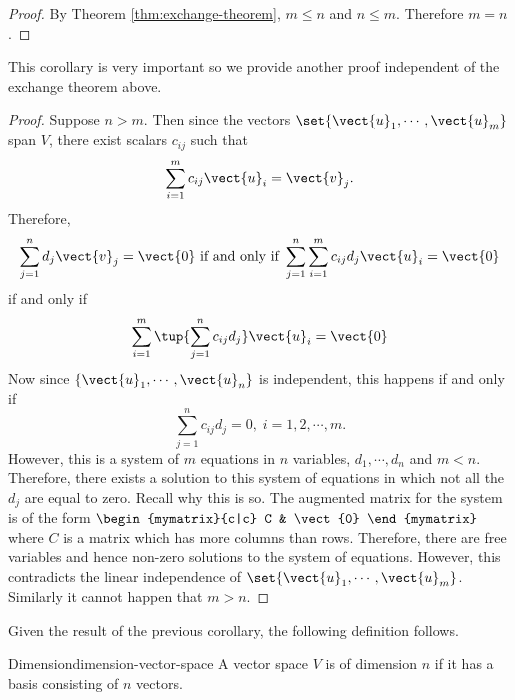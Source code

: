 \begin{proof} By Theorem \ref{thm:exchange-theorem}, $m\leq n$ and $n\leq m$. Therefore $m=n$. 
\end{proof}

This corollary is very important so we provide another proof independent of the exchange theorem above.

\begin{proof}Suppose $n > m$. Then since the vectors $\set{\vect{u}
_{1},\cdots ,\vect{u}_{m}} $ span $V$, there exist scalars $c_{ij}$
such that 
\begin{equation*}
\sum_{i=1}^{m}c_{ij}\vect{u}_{i}=\vect{v}_{j}.
\end{equation*}
Therefore, 
\begin{equation*}
\sum_{j=1}^{n}d_{j}\vect{v}_{j}=\vect{0}
\text{ if and only if }\sum_{j=1}^{n}\sum_{i=1}^{m}c_{ij}d_{j}\vect{u}_{i}=
\vect{0}
\end{equation*}
if and only if 
\begin{equation*}
\sum_{i=1}^{m}\tup{\sum_{j=1}^{n}c_{ij}d_{j}} \vect{u}_{i}=\vect{
0}
\end{equation*}
Now since $\{\vect{u}_{1},\cdots ,\vect{u}_{n}\}$ is independent, this
happens if and only if 
\begin{equation*}
\sum_{j=1}^{n}c_{ij}d_{j}=0,\;i=1,2,\cdots ,m.
\end{equation*}
However, this is a system of $m$ equations in $n$ variables, $d_{1},\cdots
,d_{n}$ and $m<n$. Therefore, there exists a solution to this system of
equations in which not all the $d_{j}$ are equal to zero. Recall why this is
so. The augmented matrix for the system is of the form 
$\begin{mymatrix}{c|c}
C & \vect{0}
\end{mymatrix} $ where $C$ is a matrix which has more columns than rows. Therefore,
there are free variables and hence non-zero solutions to the system of
equations. However, this contradicts the linear independence of $\set{
\vect{u}_{1},\cdots ,\vect{u}_{m}}$. Similarly it cannot happen
that $m > n$.
\end{proof}

Given the result of the previous corollary, the following definition follows.

\begin{definition}{Dimension}{dimension-vector-space}
 A vector space $V$ is of dimension $n$ if it has a basis consisting of $n$ vectors.
\end{definition}

